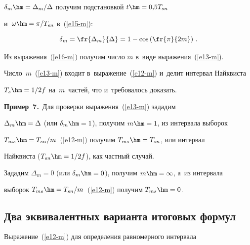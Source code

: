 $\delta_m\hm=\Delta_m/\Delta$ получим подстановкой $t\hm=0{,}5T_{sn}$ 


и~$\omega\hm=\pi/T_{sn}$ в~(\ref{e15-m}):


  \begin{equation}


  \delta_m= \fr{\Delta_m}{\Delta}=1-\cos \left( \fr{\pi}{2m}\right)\,.


  \label{e16-m}


  \end{equation}


  


  Из выражения~(\ref{e16-m}) получим число $m$ в~виде выражения~(\ref{e13-m}). 


Число~$m$~(\ref{e13-m}) входит в~выражение~(\ref{e12-m}) и~делит интервал Найквиста 


$T_s\hm=1/2f$ на~$m$~частей, что и~требовалось доказать.


  


  


  \smallskip


  


  \noindent


  \textbf{Пример~7.}\ Для проверки выражения~(\ref{e13-m}) зададим 


$\Delta_m\hm=\Delta$ (или $\delta_m\hm=1$), получим $m\hm=1$, из интервала выборок 


$T_{ms}\hm=T_{sn}/m$~(\ref{e12-m}) получим $T_{ms}\hm=T_{sn}$, или интервал 


Найквиста ($T_{sn}\hm=1/2f$), как частный случай. 


  


  


  Зададим $\Delta_m=0$ (или $\delta_m\hm=0$), получим $m\hm=\infty$, а~из интервала 


выборок $T_{ms}\hm=T_{sn}/m$~(\ref{e12-m}) получим $T_{ms}\hm=0$. 


  


  \subsection{Два эквивалентных варианта итоговых формул }


  


  Выражение~(\ref{e12-m}) для определения равномерного интервала 


